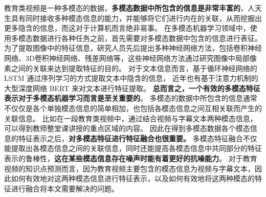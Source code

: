     教育类视频是一种多模态的数据，\textbf{多模态数据中所包含的信息是非常丰富的}，人天生具有同时接收多种模态信息的能力，并能够将它们进行内在的关联，从而挖掘出更多隐含的信息，而这对于计算机而言绝非易事。
    在多模态机器学习领域中，使用多模态数据进行各种任务之前，首先需要对多模态数据中包含的信息进行表征。
    为了提取图像中的特征信息，研究人员先后提出多种神经网络方法，包括卷积神经网络\cite{Krizhevsky2012ImageNetCW}、3D卷积神经网络\cite{Tran2015LearningSF}、残差网络\cite{He2016DeepRL}等，这些神经网络方法通过研究图像中局部像素之间的关联来达到提取特征的目的。
    对于文本信息而言，基于循环神经网络的 LSTM\cite{Hochreiter1997LongSM} 通过序列学习的方式提取文本中隐含的信息，
    近年也有基于注意力机制的大型深度网络 BERT\cite{Devlin2019BERTPO} 来对文本进行特征提取。
    \textbf{总而言之，一个有效的多模态特征表示对于多模态机器学习而言是至关重要的}\cite{Baltruaitis2019MultimodalML}。
    多模态的数据中所包含的信息通常不仅仅是各个单独模态信息的简单相加，也包括各模态信息之间互相关联而产生的关联信息。
    比如在一段教育类视频中，通过结合视频与字幕文本两种模态信息，可以得到教师整堂课讲授的重点区域的内容。 
    因此在得到多模态数据各个模态信息的特征表示之后，\textbf{对多模态特征进行特征融合也很重要。}
    多模态特征融合不仅能提取出各模态信息之间的关联信息，同时还能提高各模态信息中共同部分的特征表示的鲁棒性\cite{Baltruaitis2019MultimodalML}，\textbf{这在某些模态信息存在噪声时能有着更好的抗噪能力}。
    对于教育视频的知识点预测而言，因为教育视频主要包含的模态信息为视频与字幕文本，因此如何有效地对这两种模态信息进行特征表示，以及如何有效地将这两种模态的特征进行融合将本文需要解决的问题。

